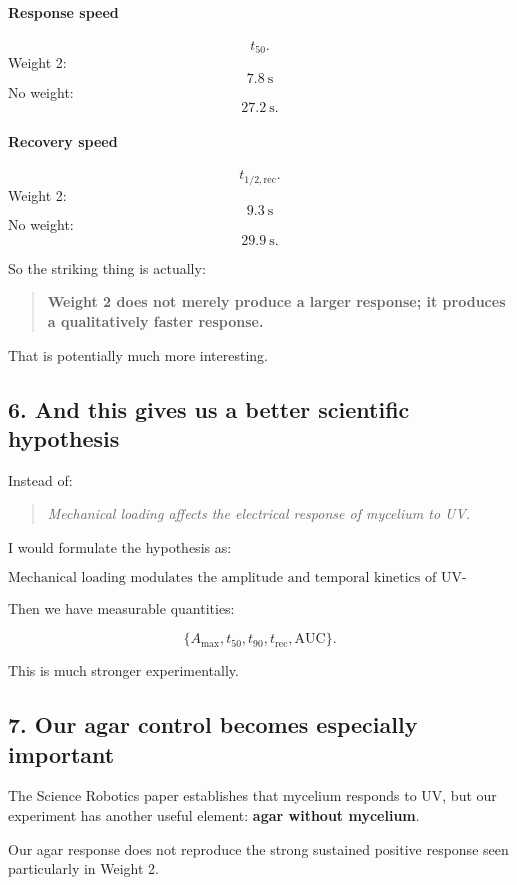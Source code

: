 \documentclass[11pt,a4paper]{article}
\begin{document}
\paragraph{Response speed}
\[
t_{50}.
\]
Weight 2:
\[
7.8\ \mathrm{s}
\]
No weight:
\[
27.2\ \mathrm{s}.
\]

\paragraph{Recovery speed}
\[
t_{1/2,\mathrm{rec}}.
\]
Weight 2:
\[
9.3\ \mathrm{s}
\]
No weight:
\[
29.9\ \mathrm{s}.
\]

So the striking thing is actually:

\begin{quote}
\textbf{Weight 2 does not merely produce a larger response; it produces a
qualitatively faster response.}
\end{quote}

That is potentially much more interesting.

\subsection{6. And this gives us a better scientific hypothesis}

Instead of:

\begin{quote}
\emph{Mechanical loading affects the electrical response of mycelium to UV.}
\end{quote}

I would formulate the hypothesis as:

\[
\boxed{
\text{Mechanical loading modulates the amplitude and temporal kinetics of
UV-induced mycelial electrophysiological responses.}
}
\]

Then we have measurable quantities:

\[
\{A_{\max},t_{50},t_{90},t_{\mathrm{rec}},\mathrm{AUC}\}.
\]

This is much stronger experimentally.

\subsection{7. Our agar control becomes especially important}

The Science Robotics paper establishes that mycelium responds to UV, but our
experiment has another useful element: \textbf{agar without mycelium}.

Our agar response does not reproduce the strong sustained positive response
seen particularly in Weight 2.
\end{document}
